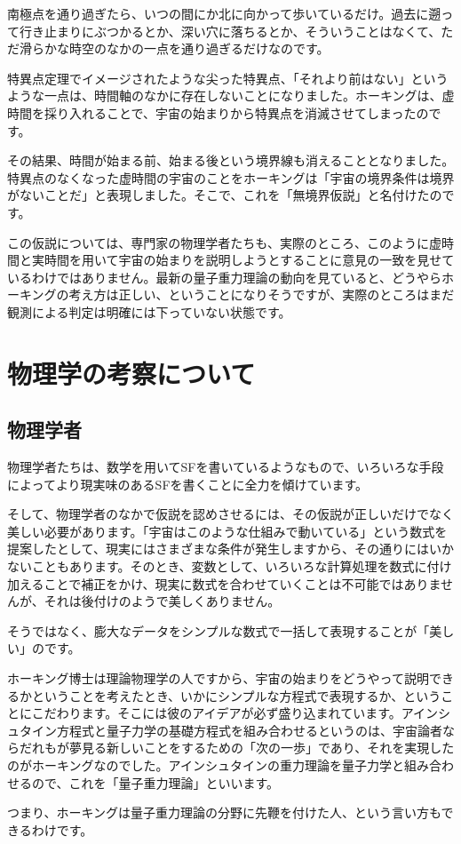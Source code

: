 \documentclass[10pt,b5paper,papersize,dvipdfmx]{jsbook}
\begin{document}
南極点を通り過ぎたら、いつの間にか北に向かって歩いているだけ。過去に遡って行き止まりにぶつかるとか、深い穴に落ちるとか、そういうことはなくて、ただ滑らかな時空のなかの一点を通り過ぎるだけなのです。\par
特異点定理でイメージされたような尖った特異点、「それより前はない」というような一点は、時間軸のなかに存在しないことになりました。ホーキングは、虚時間を採り入れることで、宇宙の始まりから特異点を消滅させてしまったのです。\par
その結果、時間が始まる前、始まる後という境界線も消えることとなりました。特異点のなくなった虚時間の宇宙のことをホーキングは「宇宙の境界条件は境界がないことだ」と表現しました。そこで、これを「無境界仮説」と名付けたのです。\par
この仮説については、専門家の物理学者たちも、実際のところ、このように虚時間と実時間を用いて宇宙の始まりを説明しようとすることに意見の一致を見せているわけではありません。最新の量子重力理論の動向を見ていると、どうやらホーキングの考え方は正しい、ということになりそうですが、実際のところはまだ観測による判定は明確には下っていない状態です。



%
\section{物理学の考察について}

\subsection{物理学者}
物理学者たちは、数学を用いてSFを書いているようなもので、いろいろな手段によってより現実味のあるSFを書くことに全力を傾けています。\par
そして、物理学者のなかで仮説を認めさせるには、その仮説が正しいだけでなく美しい必要があります。「宇宙はこのような仕組みで動いている」という数式を提案したとして、現実にはさまざまな条件が発生しますから、その通りにはいかないこともあります。そのとき、変数として、いろいろな計算処理を数式に付け加えることで補正をかけ、現実に数式を合わせていくことは不可能ではありませんが、それは後付けのようで美しくありません。\par
そうではなく、膨大なデータをシンプルな数式で一括して表現することが「美しい」のです。\par
ホーキング博士は理論物理学の人ですから、宇宙の始まりをどうやって説明できるかということを考えたとき、いかにシンプルな方程式で表現するか、ということにこだわります。そこには彼のアイデアが必ず盛り込まれています。アインシュタイン方程式と量子力学の基礎方程式を組み合わせるというのは、宇宙論者ならだれもが夢見る新しいことをするための「次の一歩」であり、それを実現したのがホーキングなのでした。アインシュタインの重力理論を量子力学と組み合わせるので、これを「量子重力理論」といいます。\par
つまり、ホーキングは量子重力理論の分野に先鞭を付けた人、という言い方もできるわけです。\par
\end{document}
